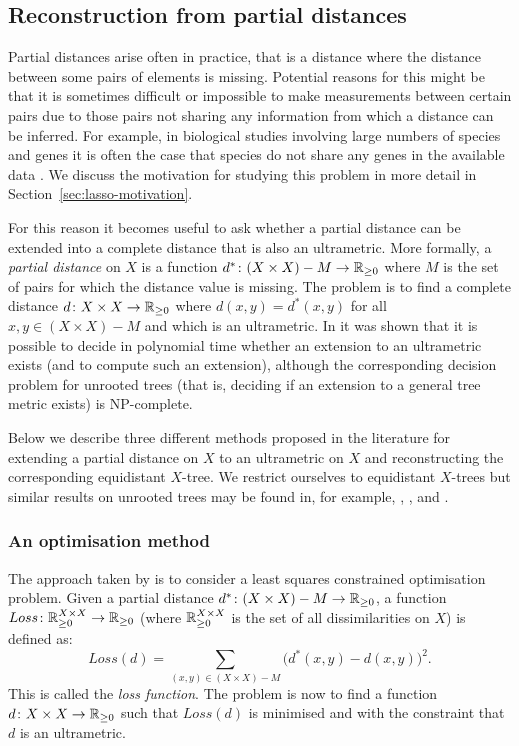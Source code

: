 \subsection{Reconstruction from partial distances}
\label{sec:constr-from-part}

Partial distances arise often in practice, that is a distance where the
distance between some pairs of elements is missing.  Potential reasons for
this might be that it is sometimes difficult or impossible to make
measurements between certain pairs due to those pairs not sharing any
information from which a distance can be inferred.  For example, in biological
studies involving large numbers of species and genes it is often the case that
species do not share any genes in the available data
\cite{criscuolo2008fastnj}.  We discuss the motivation for studying this
problem in more detail in Section~\ref{sec:lasso-motivation}.

For this reason it becomes useful to ask whether a partial distance can be
extended into a complete distance that is also an ultrametric.  More formally,
a \textit{partial distance} on $X$ is a function $d^* \colon (X \times X) - M
\to {\mathbb R}_{\geq 0}$ where $M$ is the set of pairs for which the distance value is
missing.  The problem is to find a complete distance $d \colon X \times X \to
{\mathbb R}_{\geq 0}$ where $d(x,y) = d^*(x,y)$ for all $x,y \in (X \times X) - M$ and which
is an ultrametric.  In \cite{farach1995robust} it was shown that it is
possible to decide in polynomial time whether an extension to an ultrametric
exists (and to compute such an extension), although the corresponding decision
problem for unrooted trees (that is, deciding if an extension to a general
tree metric exists) is NP-complete.

Below we describe three different methods proposed in the literature for
extending a partial distance on $X$ to an ultrametric on $X$ and
reconstructing the corresponding equidistant $X$-tree.  We restrict ourselves
to equidistant $X$-trees but similar results on unrooted trees may be found
in, for example, \cite{guenoche1999approximations}, \cite{farach1995robust},
\cite{makarenkov2001nouvelle} and \cite{guenoche2004extension}.

\subsubsection{An optimisation method}
\label{sec:part-dist-optim-method}

The approach taken by \citet{de1984ultrametric} is to consider a least squares
constrained optimisation problem.  Given a partial distance $d^* \colon (X
\times X) - M \to {\mathbb R}_{\geq 0}$, a function $Loss \colon {\mathbb R}_{\geq 0}^{X \times X} \to
{\mathbb R}_{\geq 0}$ (where ${\mathbb R}_{\geq 0}^{X \times X}$ is the set of all dissimilarities on $X$)
is defined as:
\begin{equation*}
  \label{eq:partial-dist-least-squares}
  Loss(d) = \sum_{(x,y) \in (X \times X) - M} \!\big(d^*(x,y)-d(x,y)\big)^2.
\end{equation*}
This is called the \textit{loss function}.  The problem is now to find a
function $d \colon X \times X \to {\mathbb R}_{\geq 0}$ such that $Loss(d)$ is minimised and
with the constraint that $d$ is an ultrametric.

